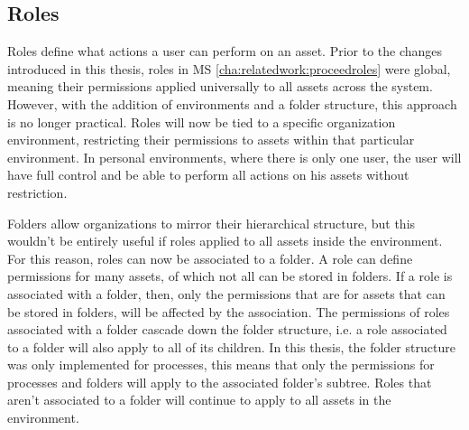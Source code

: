 \begin{itemize}
\section{Roles}
\label{cha:conceptanddesign:roles}

Roles define what actions a user can perform on an asset. Prior to the changes introduced
in this thesis, roles in MS \ref{cha:relatedwork:proceedroles} were global,
meaning their permissions applied universally
to all assets across the system.
However, with the addition of environments and a folder structure, this approach is no longer practical.
Roles will now be tied to a specific organization environment,
restricting their permissions to assets within that particular environment.
In personal environments, where there is only one user, the user will have
full control and be able to perform all actions on his assets without restriction. 

Folders allow organizations to mirror their hierarchical structure, but this wouldn't be
entirely useful if roles applied to all assets inside the environment.
For this reason, roles can now be associated to a folder.
%
A role can define permissions for many assets, of which not all can be stored in folders.
If a role is associated with a folder, then, only the permissions that are for assets that
can be stored in folders, will be affected by the association.
%
The permissions of roles associated with a folder cascade down the
folder structure, i.e. a role associated to a folder will also apply to all of its children.
In this thesis, the folder structure was only implemented for processes,
this means that only the permissions for processes and folders will apply to the
associated folder's subtree.
Roles that aren't associated to a folder will continue to apply to all assets in the environment.


\end{itemize}
